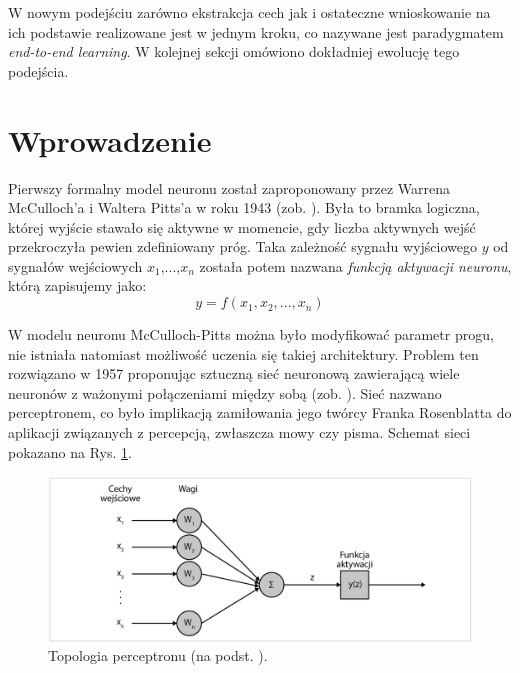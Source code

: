 W nowym podejściu zarówno ekstrakcja cech jak i ostateczne wnioskowanie \linebreak na ich podstawie realizowane jest w jednym kroku, co nazywane jest paradygmatem \textit{end-to-end learning}. W kolejnej sekcji omówiono dokładniej  ewolucję tego podejścia. 

\section{Wprowadzenie}

Pierwszy formalny model neuronu został zaproponowany przez Warrena McCulloch'a i Waltera Pitts'a w roku 1943 (zob. \cite{McCulloch1943}). Była to bramka logiczna, której wyjście stawało się aktywne w momencie, gdy liczba aktywnych wejść przekroczyła pewien zdefiniowany próg. Taka zależność sygnału wyjściowego $y$ od sygnałów wejściowych $x_1$,...,$x_n$ została potem nazwana \textit{funkcją aktywacji neuronu}, którą zapisujemy jako:
\begin{equation}
\label{eqActFunc}
y=f\left(x_1, x_2,..., x_n\right)
\end{equation}

W modelu neuronu McCulloch-Pitts można było modyfikować parametr progu, nie istniała natomiast możliwość uczenia się takiej architektury. Problem ten rozwiązano w 1957 proponując sztuczną sieć neuronową zawierającą wiele neuronów \linebreak z ważonymi połączeniami między sobą (zob. \cite{Rosenblatt1957}). Sieć nazwano perceptronem, \linebreak co było implikacją zamiłowania jego twórcy Franka Rosenblatta do aplikacji związanych z percepcją, zwłaszcza mowy czy pisma. Schemat sieci pokazano na Rys. \ref{Perceptron}.
\begin{figure}[h!]
	\centering
	\includegraphics[width=1\textwidth]{figures/perceptron.png}
	\caption{Topologia perceptronu (na podst. \cite{Rosenblatt1957}).}
	\label{Perceptron}
\end{figure}

